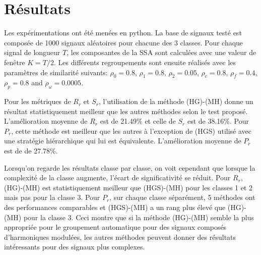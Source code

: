 \documentclass{gretsi}
\newcommand{\set}[1]{\left \{ 1, \dots, #1 \right \}}
\begin{document}

\section{Résultats}
\label{sec:res}

Les expérimentations ont été menées en python. La base de signaux testé est composée de 1000 signaux aléatoires pour chacune des 3 classes. Pour chaque signal de longueur $T$, les composantes de la SSA sont calculées avec une valeur de fenêtre $K=T/2$. Les différents regroupements sont ensuite réalisés avec les paramètres de similarité suivants: $\rho_0=0.8$, $\rho_1=0.8$, $\rho_2=0.05$, $\rho_c=0.8$, $\rho_f=0.4$, $\rho_p=0.8$ and $\rho_\omega=0.0005$.

Pour les métriques de $R_r$ et $S_r$, l'utilisation de la méthode (HG)-(MH) donne un résultat statistiquement meilleur que les autres méthodes selon le test proposé. L'amélioration moyenne de $R_r$ est de 21.49\% et celle de $S_r$ est de 38.16\%. Pour $P_r$, cette méthode est meilleur que les autres à l'exception de (HGS) utilisé avec une stratégie hiérarchique qui lui est équivalente. L'amélioration moyenne de $P_r$ est de de 27.78\%.

Lorsqu'on regarde les résultats classe par classe, on voit cependant que lorsque la complexité de la classe augmente, l'écart de significativité se réduit. Pour $R_r$, (HG)-(MH) est statistiquement meilleur que (HGS)-(MH) pour les classes 1 et 2 mais pas pour la classe 3.  Pour $P_r$, sur chaque classe séparément, 5 méthodes ont des performances comparables et (HGS)-(MH) a un rang plus élevé que (HG)-(MH) pour la classe 3. Ceci montre que si la méthode (HG)-(MH) semble la plus appropriée pour le groupement automatique pour des signaux composés d'harmoniques modulées, les autres méthodes peuvent donner des résultats intéressants pour des signaux plus complexes.

 
{}
\end{document}

